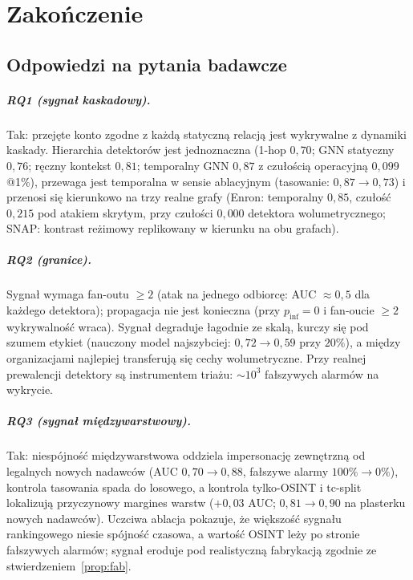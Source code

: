 \chapter{Zakończenie}
\label{rozd:zakonczenie}

\section{Odpowiedzi na pytania badawcze}
\label{sec:z-rq}

\paragraph{RQ1 (sygnał kaskadowy).} Tak: przejęte konto zgodne
z każdą statyczną relacją jest wykrywalne z dynamiki kaskady.
Hierarchia detektorów jest jednoznaczna (1-hop $0{,}70$; GNN
statyczny $0{,}76$; ręczny kontekst $0{,}81$; temporalny GNN
$0{,}87$ z czułością operacyjną $0{,}099$@1\%), przewaga jest
temporalna w sensie ablacyjnym (tasowanie: $0{,}87\to0{,}73$)
i przenosi się kierunkowo na trzy realne grafy (Enron: temporalny
$0{,}85$, czułość $0{,}215$ pod atakiem skrytym, przy czułości
$0{,}000$ detektora wolumetrycznego; SNAP: kontrast reżimowy
replikowany w kierunku na obu grafach).

\paragraph{RQ2 (granice).} Sygnał wymaga fan-outu $\ge2$ (atak
na jednego odbiorcę: AUC $\approx0{,}5$ dla każdego detektora);
propagacja nie jest konieczna (przy $p_{\mathrm{inf}}=0$ i fan-oucie
$\ge2$ wykrywalność wraca). Sygnał degraduje łagodnie ze skalą,
kurczy się pod szumem etykiet (nauczony model najszybciej:
$0{,}72\to0{,}59$ przy $20\%$), a między organizacjami najlepiej
transferują się cechy wolumetryczne. Przy realnej prewalencji
detektory są instrumentem triażu: $\sim\!10^3$ fałszywych alarmów
na wykrycie.

\paragraph{RQ3 (sygnał międzywarstwowy).} Tak: niespójność
międzywarstwowa oddziela impersonację zewnętrzną od legalnych
nowych nadawców (AUC $0{,}70\to0{,}88$, fałszywe alarmy
$100\%\to0\%$), kontrola tasowania spada do losowego, a kontrola
tylko-OSINT i tc-split lokalizują przyczynowy margines warstw
($+0{,}03$ AUC; $0{,}81\to0{,}90$ na plasterku nowych nadawców).
Uczciwa ablacja pokazuje, że większość sygnału rankingowego niesie
spójność czasowa, a wartość OSINT leży po stronie fałszywych
alarmów; sygnał eroduje pod realistyczną fabrykacją zgodnie ze
stwierdzeniem~\ref{prop:fab}.

